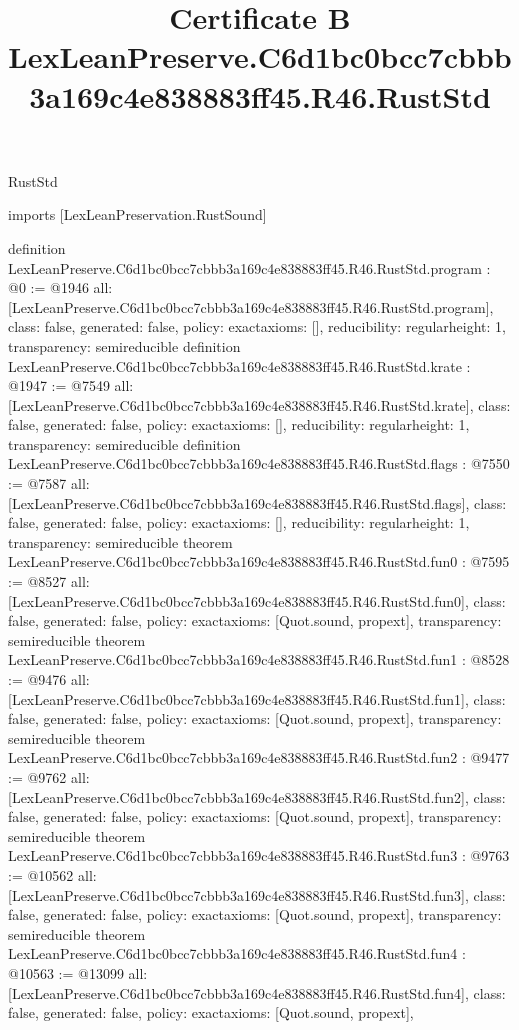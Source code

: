 \begin{lexlean}{RustStd}
\title{Certificate B LexLeanPreserve.C6d1bc0bcc7cbbb3a169c4e838883ff45.R46.RustStd}
\begin{coremodule}
imports [LexLeanPreservation.RustSound]

definition LexLeanPreserve.C6d1bc0bcc7cbbb3a169c4e838883ff45.R46.RustStd.program : @0 := @1946 {
  all: [LexLeanPreserve.C6d1bc0bcc7cbbb3a169c4e838883ff45.R46.RustStd.program],
  class: false,
  generated: false,
  policy: exact{axioms: []},
  reducibility: regular{height: 1},
  transparency: semireducible
}
definition LexLeanPreserve.C6d1bc0bcc7cbbb3a169c4e838883ff45.R46.RustStd.krate : @1947 := @7549 {
  all: [LexLeanPreserve.C6d1bc0bcc7cbbb3a169c4e838883ff45.R46.RustStd.krate],
  class: false,
  generated: false,
  policy: exact{axioms: []},
  reducibility: regular{height: 1},
  transparency: semireducible
}
definition LexLeanPreserve.C6d1bc0bcc7cbbb3a169c4e838883ff45.R46.RustStd.flags : @7550 := @7587 {
  all: [LexLeanPreserve.C6d1bc0bcc7cbbb3a169c4e838883ff45.R46.RustStd.flags],
  class: false,
  generated: false,
  policy: exact{axioms: []},
  reducibility: regular{height: 1},
  transparency: semireducible
}
theorem LexLeanPreserve.C6d1bc0bcc7cbbb3a169c4e838883ff45.R46.RustStd.fun0 : @7595 := @8527 {
  all: [LexLeanPreserve.C6d1bc0bcc7cbbb3a169c4e838883ff45.R46.RustStd.fun0],
  class: false,
  generated: false,
  policy: exact{axioms: [Quot.sound, propext]},
  transparency: semireducible
}
theorem LexLeanPreserve.C6d1bc0bcc7cbbb3a169c4e838883ff45.R46.RustStd.fun1 : @8528 := @9476 {
  all: [LexLeanPreserve.C6d1bc0bcc7cbbb3a169c4e838883ff45.R46.RustStd.fun1],
  class: false,
  generated: false,
  policy: exact{axioms: [Quot.sound, propext]},
  transparency: semireducible
}
theorem LexLeanPreserve.C6d1bc0bcc7cbbb3a169c4e838883ff45.R46.RustStd.fun2 : @9477 := @9762 {
  all: [LexLeanPreserve.C6d1bc0bcc7cbbb3a169c4e838883ff45.R46.RustStd.fun2],
  class: false,
  generated: false,
  policy: exact{axioms: [Quot.sound, propext]},
  transparency: semireducible
}
theorem LexLeanPreserve.C6d1bc0bcc7cbbb3a169c4e838883ff45.R46.RustStd.fun3 : @9763 := @10562 {
  all: [LexLeanPreserve.C6d1bc0bcc7cbbb3a169c4e838883ff45.R46.RustStd.fun3],
  class: false,
  generated: false,
  policy: exact{axioms: [Quot.sound, propext]},
  transparency: semireducible
}
theorem LexLeanPreserve.C6d1bc0bcc7cbbb3a169c4e838883ff45.R46.RustStd.fun4 : @10563 := @13099 {
  all: [LexLeanPreserve.C6d1bc0bcc7cbbb3a169c4e838883ff45.R46.RustStd.fun4],
  class: false,
  generated: false,
  policy: exact{axioms: [Quot.sound, propext]},
}
\end{coremodule}
\end{lexlean}
